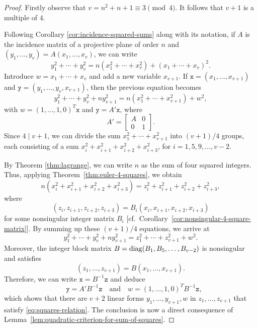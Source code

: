 \begin{proof}
    Firstly observe that $v=n^2+n+1\equiv 3\pmod4$. It follows that $v+1$ is a multiple of $4$.

    Following Corollary \ref{cor:incidence-squared-sums} along with its notation, if $A$ is the incidence matrix of a projective plane of order $n$ and $(y_1,\dots,y_v)= A(x_1,\dots,x_v)$, we can write
    $$
        y_1^2+\cdots+y_v^2 = n(x_1^2+\cdots+x_v^2)
            + (x_1+\cdots+x_v)^2.
    $$
    Introduce $w=x_1+\cdots+x_v$ and add a new variable $x_{v+1}$. If $\mathtt x=(x_1,\dots,x_{v+1})$ and $\mathtt y=(y_1,\dots,y_v,x_{v+1})$, then the previous equation becomes
    \begin{equation}\label{eq:basic-quadratic}
        y_1^2+\cdots+y_v^2+ny_{v+1}^2 = n(x_1^2+\cdots+x_{v+1}^2) + w^2,
    \end{equation}
    with $w=(1,\dots,1,0)^T\mathtt x$ and $\mathtt y=A'\mathtt x$, where
    $$
        A'=\begin{bmatrix}
            A&0\\
            0&1
        \end{bmatrix}.
    $$
    Since $4\mid v+1$, we can divide the sum $x_1^2+\cdots+x_{v+1}^2$ into $(v+1)/4$ groups, each consisting of a sum $x^2_i+x^2_{i+1}+x^2_{i+2}+x^2_{i+3}$, for $i=1,5,9,\dots,v-2$.

    By Theorem \ref{thm:lagrange}, we can write $n$ as the sum of four squared integers. Thus, applying Theorem~\ref{thm:euler-4-squares}, we obtain
    $$
        n(x^2_i+x^2_{i+1}+x^2_{i+2}+x^2_{i+3})
            = z^2_i+z^2_{i+1}+z^2_{i+2}+z^2_{i+3},
    $$
    where
    $$
        (z_i,z_{i+1},z_{i+2},z_{i+3})
            =B_i(x_i,x_{i+1},x_{i+2},x_{i+3})
    $$
    for some nonsingular integer matrix $B_i$ [cf.~Corollary~\ref{cor:nonsingular-4-square-matrix}]. By summing up these $(v+1)/4$ equations, we arrive at
    \begin{equation}\label{eq:squares-relation}
        y_1^2+\cdots+y_v^2+ny_{v+1}^2
            = z_1^2+\cdots+z_{v+1}^2 + w^2.
    \end{equation}
    Moreover, the integer block matrix $B={\operatorname{diag}}(B_1,B_5,\dots,B_{v-2})$ is nonsingular and satisfies
    $$
        (z_1,\dots,z_{v+1}) = B(x_1,\dots,x_{v+1}).
    $$
    Therefore, we can write $\mathtt x=B^{-1}\mathtt z$ and deduce
    \begin{equation}\label{eq:linear-relations}
        \quad\mathtt y=A'B^{-1}\mathtt z
        \quad\text{and}\quad
        w=(1,\dots,1,0)^TB^{-1}\mathtt z,
    \end{equation}
    which shows that there are $v+2$ linear forms $y_1,\dots,y_{v+1},w$ in $z_1,\dots,z_{v+1}$ that satisfy \eqref{eq:squares-relation}. The conclusion is now a direct consequence of Lemma~\ref{lem:quadratic-criterion-for-sum-of-squares}.
    
\end{proof}

